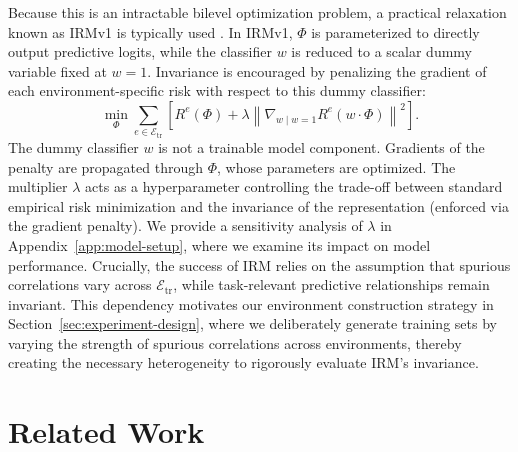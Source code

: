 \documentclass[11pt]{article}
\theoremstyle{definition}
\theoremstyle{plain}
\begin{document}
Because this is an intractable bilevel optimization problem, a practical relaxation known as IRMv1 is typically used \citep{arjovsky2019invariant, choe2020empirical, dranker2021irm}. In IRMv1, \(\Phi\) is parameterized to directly output predictive logits, while the classifier \(w\) is reduced to a scalar dummy variable fixed at \(w=1\). Invariance is encouraged by penalizing the gradient of each environment-specific risk with respect to this dummy classifier:
\begin{equation}
\label{eq:irmv1}
\min_{\Phi} \sum_{e\in\mathcal E_{\mathrm{tr}}}
\left[
R^e(\Phi)
+ \lambda \left\| \nabla_{w\mid w=1} R^e(w\cdot\Phi) \right\|^2
\right].
\end{equation}
The dummy classifier \(w\) is not a trainable model component. Gradients of the penalty are propagated through \(\Phi\), whose parameters are optimized. The multiplier $\lambda$ acts as a hyperparameter controlling the trade-off between standard empirical risk minimization and the invariance of the representation (enforced via the gradient penalty). We provide a sensitivity analysis of $\lambda$ in Appendix~\ref{app:model-setup}, where we examine its impact on model performance. Crucially, the success of IRM relies on the assumption that spurious correlations vary across $\mathcal{E}_{\text{tr}}$, while task-relevant predictive relationships remain invariant. This dependency motivates our environment construction strategy in Section~\ref{sec:experiment-design}, where we deliberately generate training sets by varying the strength of spurious correlations across environments, thereby creating the necessary heterogeneity to rigorously evaluate IRM's invariance.


\section{Related Work}
\label{sec:related-work}
\end{document}
